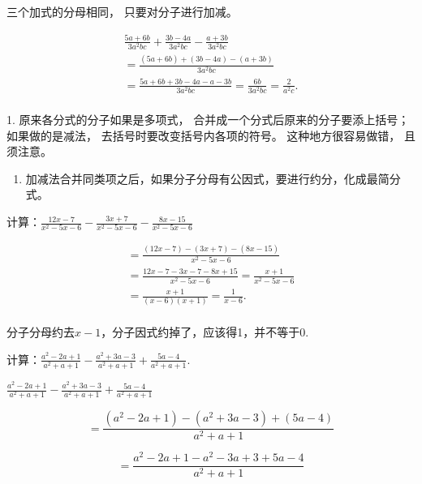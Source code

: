 三个加式的分母相同， 只要对分子进行加减。

\[
\begin{array}{l} \frac{5 a + 6 b}{3 a ^{2} b c} + \frac{3 b - 4 a}{3 a ^{2} b c} - \frac{a + 3 b}{3 a ^{2} b c} \\ = \frac{(5 a + 6 b) + (3 b - 4 a) - (a + 3 b)}{3 a ^{2} b c} \\ = \frac{5 a + 6 b + 3 b - 4 a - a - 3 b}{3 a ^{2} b c} = \frac{6 b}{3 a ^{2} b c} = \frac{2}{a ^{2} c}. \\ \end{array}
\]

 1. 原来各分式的分子如果是多项式，
合并成一个分式后原来的分子要添上括号； 如果做的是减法，
去括号时要改变括号内各项的符号。 这种地方很容易做错， 且须注意。

\begin{enumerate}[start=2]
\item
  加减法合并同类项之后，如果分子分母有公因式，要进行约分，化成最简分式。
\end{enumerate}

计算：\(\frac{12x - 7}{x^2 - 5x - 6} -\frac{3x + 7}{x^2 - 5x - 6} -\frac{8x - 15}{x^2 - 5x - 6}\)

\[
\begin{array}{l} = \frac{(12 x - 7) - (3 x + 7) - (8 x - 15)}{x ^{2} - 5 x - 6} \\ = \frac{12 x - 7 - 3 x - 7 - 8 x + 15}{x ^{2} - 5 x - 6} = \frac{x + 1}{x ^{2} - 5 x - 6} \\ = \frac{x + 1}{(x - 6) (x + 1)} = \frac{1}{x - 6}. \\ \end{array}
\]



分子分母约去\(x - 1\)，分子因式约掉了，应该得1，并不等于0.

计算：\(\frac{a^2 - 2a + 1}{a^2 + a + 1} -\frac{a^2 + 3a - 3}{a^2 + a + 1} +\frac{5a - 4}{a^2 + a + 1}.\)

\(\frac{a^2 - 2a + 1}{a^2 + a + 1} - \frac{a^2 + 3a - 3}{a^2 + a + 1} + \frac{5a - 4}{a^2 + a + 1}\)

\[
= \frac{(a ^{2} - 2 a + 1) - (a ^{2} + 3 a - 3) + (5 a - 4)}{a ^{2} + a + 1}
\]

\[
= \frac{a ^{2} - 2 a + 1 - a ^{2} - 3 a + 3 + 5 a - 4}{a ^{2} + a + 1}
\]

